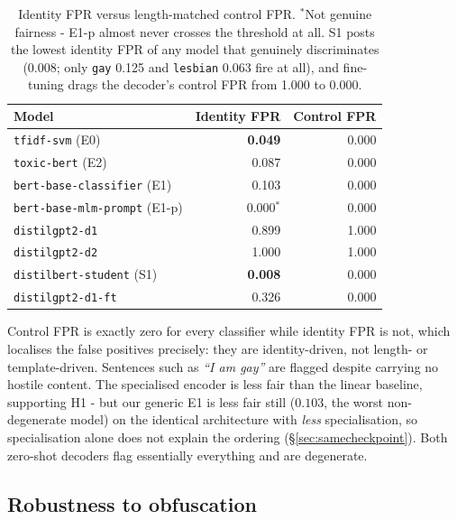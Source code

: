 \documentclass[10pt,a4paper]{article}
\begin{document}
\begin{table}[H]
\centering
\footnotesize
\setlength{\tabcolsep}{11pt}
\renewcommand{\arraystretch}{1.15}
\begin{tabular}{@{}l r r@{}}
\toprule
\textbf{Model} & \textbf{Identity FPR} & \textbf{Control FPR} \\
\midrule
\texttt{tfidf-svm} (E0)              & \textbf{0.049} & 0.000 \\
\rowcolor{rowgray}
\texttt{toxic-bert} (E2)             & 0.087 & 0.000 \\
\texttt{bert-base-classifier} (E1)   & 0.103 & 0.000 \\
\rowcolor{rowgray}
\texttt{bert-base-mlm-prompt} (E1-p) & 0.000$^{*}$ & 0.000 \\
\texttt{distilgpt2-d1}               & 0.899 & 1.000 \\
\rowcolor{rowgray}
\texttt{distilgpt2-d2}               & 1.000 & 1.000 \\
\texttt{distilbert-student} (S1)     & \textbf{0.008} & 0.000 \\
\rowcolor{rowgray}
\texttt{distilgpt2-d1-ft}            & 0.326 & 0.000 \\
\bottomrule
\end{tabular}
\caption{Identity FPR versus length-matched control FPR.
$^{*}$Not genuine fairness - E1-p almost never crosses the threshold at all.
S1 posts the lowest identity FPR of any model that genuinely discriminates
(0.008; only \texttt{gay} 0.125 and \texttt{lesbian} 0.063 fire at all), and
fine-tuning drags the decoder's control FPR from 1.000 to 0.000.}
\label{tab:fairness}
\end{table}

Control FPR is exactly zero for every classifier while identity FPR is not, which
localises the false positives precisely: they are identity-driven, not length- or
template-driven. Sentences such as \emph{``I am gay''} are flagged despite carrying
no hostile content. The specialised encoder is less fair than the linear baseline,
supporting H1 - but our generic E1 is less fair still ($0.103$, the worst
non-degenerate model) on the identical architecture with \emph{less} specialisation,
so specialisation alone does not explain the ordering (\S\ref{sec:samecheckpoint}).
Both zero-shot decoders flag essentially everything and are degenerate.

\subsection{Robustness to obfuscation}
\label{sec:robust}
\end{document}

